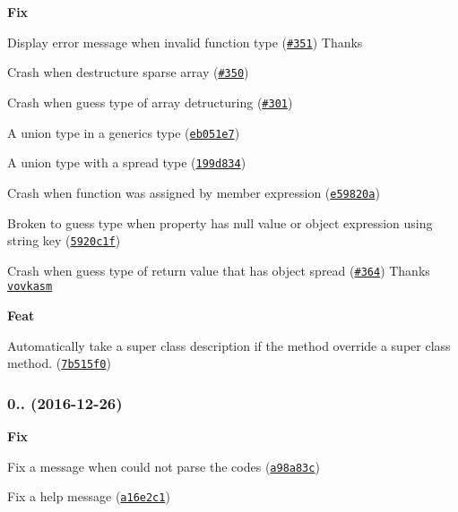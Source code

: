 \begin{DoxyItemize}
\item {\bfseries Fix}
\begin{DoxyItemize}
\item Display error message when invalid function type (\href{https://github.com/esdoc/esdoc/issues/351}{\tt \#351}) Thanks \href{https://github.com/LukasHechenberger}{\tt }
\item Crash when destructure sparse array (\href{https://github.com/esdoc/esdoc/issues/350}{\tt \#350})
\item Crash when guess type of array detructuring (\href{https://github.com/esdoc/esdoc/issues/301}{\tt \#301})
\item A union type in a generics type (\href{https://github.com/esdoc/esdoc/commit/eb051e729b83bca552a3d4b43351dc1272ee4154}{\tt eb051e7})
\item A union type with a spread type (\href{https://github.com/esdoc/esdoc/commit/199d834cfe68ba986212b51cb59ea2d9de55ba1c}{\tt 199d834})
\item Crash when function was assigned by member expression (\href{https://github.com/esdoc/esdoc/commit/e59820aed2f3e2091f32d35de34925d0132630e0}{\tt e59820a})
\item Broken to guess type when property has null value or object expression using string key (\href{https://github.com/esdoc/esdoc/commit/5920c1f91633202ec795f360bb0ac12f68f258f2}{\tt 5920c1f})
\item Crash when guess type of return value that has object spread (\href{https://github.com/esdoc/esdoc/pull/364}{\tt \#364}) Thanks \href{https://github.com/vovkasm}{\tt vovkasm}
\end{DoxyItemize}
\item {\bfseries Feat}
\begin{DoxyItemize}
\item Automatically take a super class description if the method override a super class method. (\href{https://github.com/esdoc/esdoc/commit/7b515f0367a386ceb732b4606b96abf24bfab627}{\tt 7b515f0})
\end{DoxyItemize}
\end{DoxyItemize}

\subsubsection*{0.. (2016-\/12-\/26)}


\begin{DoxyItemize}
\item {\bfseries Fix}
\begin{DoxyItemize}
\item Fix a message when could not parse the codes (\href{https://github.com/esdoc/esdoc/commit/a98a83c2cdb2904e2f8a246dee8cf886da47fc48}{\tt a98a83c})
\item Fix a help message (\href{https://github.com/esdoc/esdoc/commit/a16e2c121989d7a294d2cf2b6c2b1d1ec32f4277}{\tt a16e2c1})
\end{DoxyItemize}
\end{DoxyItemize}

